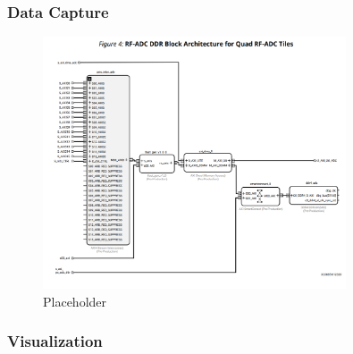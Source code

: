 \subsubsection{Data Capture}
\begin{figure}[H]
	\centering
	\includegraphics[width = 0.8\textwidth]{chap/04-work/img/adc_cap}
	\caption{Placeholder}
	\label{fig:adccap}
\end{figure}

\subsubsection{Visualization}





